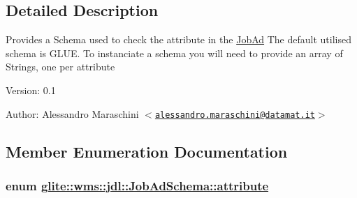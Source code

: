 \subsection{Detailed Description}
Provides a Schema used to check the attribute in the \hyperlink{classglite_1_1wms_1_1jdl_1_1JobAd}{Job\-Ad} The default utilised schema is GLUE. To instanciate a schema you will need to provide an array of Strings, one per attribute \begin{Desc}
\item[Version:]0.1 \end{Desc}
\begin{Desc}
\item[Author:]Alessandro Maraschini $<$\href{mailto:alessandro.maraschini@datamat.it}{\tt alessandro.maraschini@datamat.it}$>$ \end{Desc}




\subsection{Member Enumeration Documentation}
\hypertarget{classglite_1_1wms_1_1jdl_1_1JobAdSchema_w6}{
\subsubsection[attribute]{\setlength{\rightskip}{0pt plus 5cm}enum \hyperlink{classglite_1_1wms_1_1jdl_1_1JobAdSchema_w6}{glite::wms::jdl::Job\-Ad\-Schema::attribute}}}
\label{classglite_1_1wms_1_1jdl_1_1JobAdSchema_w6}



